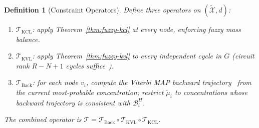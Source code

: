 \documentclass[twocolumn,10pt,a4paper]{article}
\newcommand{\Back}{\mathcal{B}}
\newtheorem{definition}[theorem]{Definition}
\begin{document}
\begin{definition}[Constraint Operators]
\label{def:operators}
Define three operators on $(\widetilde{\mathcal{X}},d)$:
\begin{enumerate}[label=(\roman*),noitemsep]
  \item $\mathcal{T}_{\mathrm{KCL}}$: apply Theorem~\ref{thm:fuzzy-kcl} at
        every node, enforcing fuzzy mass balance.
  \item $\mathcal{T}_{\mathrm{KVL}}$: apply Theorem~\ref{thm:fuzzy-kvl} to
        every independent cycle in $G$ (circuit rank $R-N+1$ cycles
        suffice~\cite{HeinrichSchuster1996}).
  \item $\mathcal{T}_{\mathrm{Back}}$: for each node $v_i$, compute the
        Viterbi MAP backward trajectory~\cite{Viterbi1967,Forney1973} from
        the current most-probable concentration; restrict $\tilde{\mu}_i$ to
        concentrations whose backward trajectory is consistent with $\Back_i^H$.
\end{enumerate}
The combined operator is
$\mathcal{T}=\mathcal{T}_{\mathrm{Back}}\circ
\mathcal{T}_{\mathrm{KVL}}\circ\mathcal{T}_{\mathrm{KCL}}$.
\end{definition}
\end{document}
